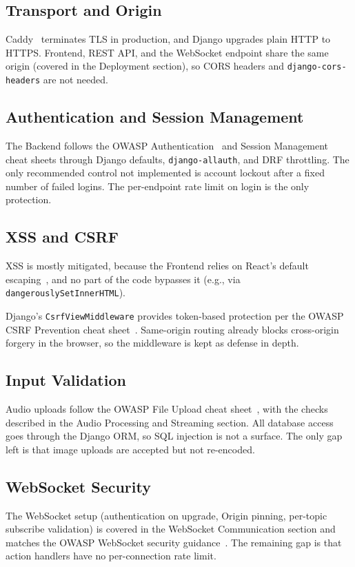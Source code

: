 \subsection{Transport and Origin}
Caddy~\parencite{caddy} terminates TLS in production, and Django
upgrades plain HTTP to HTTPS\@. Frontend, REST API, and the WebSocket
endpoint share the same origin (covered in the Deployment section),
so CORS headers and \texttt{django-cors-headers} are not needed.

\subsection{Authentication and Session Management}
The Backend follows the OWASP Authentication~\parencite{owasp_authentication} and Session Management~\parencite{owasp_session_management}
cheat sheets through Django defaults, \texttt{django-allauth}, and
DRF throttling. The only recommended control not implemented is
account lockout after a fixed number of failed logins. The
per-endpoint rate limit on login is the only protection.

\subsection{XSS and CSRF}
XSS is mostly mitigated, because the Frontend relies on React's
default escaping~\parencite{react}, and no part of the code bypasses
it (e.g., via \texttt{dangerouslySetInnerHTML}).

Django's \texttt{CsrfViewMiddleware} provides token-based protection
per the OWASP CSRF Prevention cheat sheet~\parencite{owasp_csrf}. Same-origin routing
already blocks cross-origin forgery in the browser, so the middleware
is kept as defense in depth.

\subsection{Input Validation}
Audio uploads follow the OWASP File Upload cheat sheet~\parencite{owasp_file_upload}, with the
checks described in the Audio Processing and Streaming section. All
database access goes through the Django ORM, so SQL injection is not
a surface. The only gap left is that image uploads are accepted but
not re-encoded.

\subsection{WebSocket Security}
The WebSocket setup (authentication on upgrade, Origin pinning,
per-topic subscribe validation) is covered in the WebSocket
Communication section and matches the OWASP WebSocket security
guidance~\parencite{owasp_websocket}. The remaining gap is that action handlers have no
per-connection rate limit.

